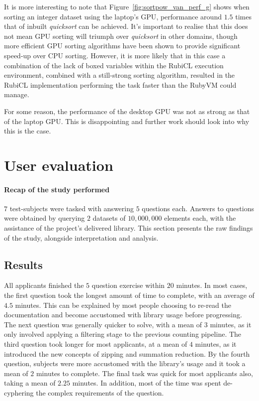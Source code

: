 It is more interesting to note that Figure~\ref{fig:sortpow_van_perf_g} shows when sorting an integer dataset using the laptop's \ac{GPU}, performance around $1.5$ times that of inbuilt \emph{quicksort} can be achieved. It's important to realise that this does not mean \ac{GPU} sorting will triumph over \emph{quicksort} in other domains, though more efficient \ac{GPU} sorting algorithms have been shown to provide significant speed-up over \ac{CPU} sorting\cite{sintorn2008fast}. However, it is more likely that in this case a combination of the lack of boxed variables within the RubiCL execution environment, combined with a still-strong sorting algorithm, resulted in the RubiCL implementation performing the task faster than the RubyVM could manage.

For some reason, the performance of the desktop \ac{GPU} was not as strong as that of the laptop \ac{GPU}. This is disappointing and further work should look into why this is the case.
\section{User evaluation}
\paragraph*{Recap of the study performed}
$7$ test-subjects were tasked with answering $5$ questions each. Answers to questions were obtained by querying $2$ datasets of $10,000,000$ elements each, with the assistance of the project's delivered library. This section presents the raw findings of the study, alongside interpretation and analysis.

\subsection{Results}
All applicants finished the $5$ question exercise within $20$ minutes. In most cases, the first question took the longest amount of time to complete, with an average of $4.5$ minutes. This can be explained by most people choosing to re-read the documentation and become accustomed with library usage before progressing. The next question was generally quicker to solve, with a mean of $3$ minutes, as it only involved applying a filtering stage to the previous counting pipeline. The third question took longer for most applicants, at a mean of $4$ minutes, as it introduced the new concepts of zipping and summation reduction. By the fourth question, subjects were more accustomed with the library's usage and it took a mean of $2$ minutes to complete. The final task was quick for most applicants also, taking a mean of $2.25$ minutes. In addition, most of the time was spent de-cyphering the complex requirements of the question.

